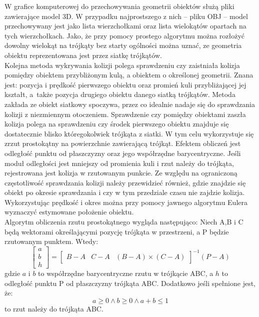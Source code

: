 W grafice komputerowej do przechowywania geometrii obiektów służą pliki zawierające model 3D. W przypadku najprostszego z nich -- pliku OBJ -- model przechowywany jest jako lista wierzchołkami oraz lista wielokątów opartach na tych wierzchołkach. Jako, że przy pomocy prostego algorytmu można rozłożyć dowolny wielokąt na trójkąty bez starty ogólności można uznać, ze geometria obiektu reprezentowana jest przez siatkę trójkątów.\\

Kolejna metoda wykrywania kolizji polega sprawdzeniu czy zaistniała kolizja pomiędzy obiektem przybliżonym kulą, a obiektem o określonej geometrii. Znana jest: pozycja i prędkość pierwszego obiektu oraz promień kuli przybliżającej jej kształt, a~także pozycja drugiego obiektu danego siatką trójkątów. Metoda zakłada ze obiekt siatkowy spoczywa, przez co idealnie nadaje się do sprawdzania kolizji z niezmiennym otoczeniem. Sprawdzenie czy pomiędzy obiektami zaszła kolizja polega na sprawdzeniu czy środek pierwszego obiektu znajduje się dostatecznie blisko któregokolwiek trójkąta z siatki. W tym celu wykorzystuje się zrzut prostokątny na powierzchnie zawierającą trójkąt. Efektem obliczeń jest odległość punktu od płaszczyzny oraz jego współrzędne barycentryczne. Jeśli moduł odległości jest mniejszy od promienia kuli i rzut należy do trójkąta, rejestrowana jest kolizja w rzutowanym punkcie. Ze względu na ograniczoną częstotliwość sprawdzania kolizji należy przewidzieć również, gdzie znajdzie się obiekt po okresie sprawdzania i czy w tym przedziale czasu nie zajdzie kolizja. Wykorzystując prędkość i okres można przy pomocy jawnego algorytmu Eulera wyznaczyć estymowane położenie obiektu.\\

Algorytm obliczenia rzutu prostokątnego wygląda następująco: Niech A,B i C będą wektorami określającymi pozycję trójkąta w przestrzeni, a P będzie rzutowanym punktem. Wtedy:
\[
	\begin{bmatrix}
	a \\ b \\ h
	\end{bmatrix}
	=
	\begin{bmatrix}
	B - A & C - A & (B - A) \times (C - A)
	\end{bmatrix}^{-1} \left( P - A \right)
\]
gdzie $a$ i $b$ to współrzędne barycentryczne rzutu w trójkącie ABC, a $h$ to odległość punktu P od płaszczyzny trójkąta ABC. Dodatkowo jeśli spełnione jest, że:
\[
a \geq 0 \land b \geq 0 \land a + b \leq 1
\]
to rzut należy do trójkąta ABC.\\

